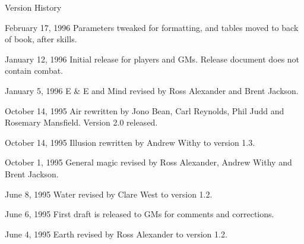 \begin{Chapter}{Version History}
\begin{Description}
\item[February 17, 1996] Parameters tweaked for formatting, and tables
  moved to back of book, after skills.

\item[January 12, 1996] Initial release for players and GMs. Release
  document does not contain combat.

\item[January 5, 1996] E \& E and Mind revised by Ross Alexander and
  Brent Jackson.

\item[October 14, 1995] Air rewritten by Jono Bean, Carl Reynolds,
  Phil Judd and Rosemary Mansfield.  Version 2.0 released.

\item[October 14, 1995] Illusion rewritten by Andrew Withy to version
  1.3.

\item[October 1, 1995] General magic revised by Ross Alexander, Andrew
  Withy and Brent Jackson.

\item[June 8, 1995] Water revised by Clare West to version 1.2.

\item[June 6, 1995] First draft is released to GMs for comments and
  corrections.

\item[June 4, 1995] Earth revised by Ross Alexander to version 1.2.


\end{Description}

\end{Chapter}
